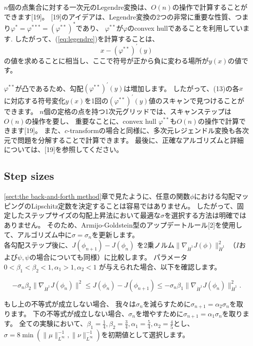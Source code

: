 \documentclass{jsarticle}
\theoremstyle{definition}
\begin{document}
$n$個の点集合に対する一次元のLegendre変換は、$O(n)$の操作で計算することができます[19]。
[19]のアイデアは、Legendre変換の2つの非常に重要な性質、つまり$\varphi^* = \varphi^{***} = (\varphi^{**})^*$であり、
$\varphi^{**}$が$\varphi$のconvex hullであることを利用しています.
したがって、(\ref{eq:legendre})を計算することは、
\begin{equation}
  x - (\varphi^{**})^\prime(y)
\end{equation}
の値を求めることに相当し、ここで符号が正から負に変わる場所が$y(x)$の値です。

$\varphi^{**}$が凸であるため、勾配$(\varphi^{**})^\prime(y)$は増加します。
したがって、(13)の各$x$に対応する符号変化$y(x)$を1回の$(\varphi^{**})^\prime(y)$値のスキャンで見つけることができます。
$n$個の定格の点を持つ1次元グリッドでは、スキャンステップは$O(n)$の操作を要し、
重要なことに、convex hull $\varphi^{**}$も$O(n)$の操作で計算できます[19]。
また、$c$-transformの場合と同様に、多次元レジェンドル変換も各次元で問題を分解することで計算できます。
最後に、正確なアルゴリズムと詳細については、[19]を参照してください。

\subsection{Step sizes}

\ref{sect:the back-and-forth method}章で見たように、任意の関数$\phi$における勾配マッピングのLipschitz定数を決定することは容易ではありません。
したがって、固定したステップサイズの勾配上昇法において最適な$\sigma$を選択する方法は明確ではありません。
そのため、Armijo-Goldstein型のアップデートルール[2]を使用して、アルゴリズム中に$\sigma = \sigma_n$を更新します。\\

各勾配ステップ後に、$J(\phi_{n+1})-J(\phi_n)$ を2乗ノルム$\| \nabla_{\dot{H}^1} J(\phi) \|_{\dot{H}^1}^2$ （$I$および$\psi, \psi$の場合についても同様）に比較します。
パラメータ$0<\beta_1<\beta_2<1, \alpha_1>1, \alpha_2<1$ が与えられた場合、以下を確認します。

$$
- \sigma_n \beta_2 \|\nabla_{\dot{H}^1} J(\phi_n)\|^2 \leq J(\phi_n)-J(\phi_{n+1}) \leq - \sigma_n \beta_1 \|\nabla_{\dot{H}^1} J(\phi_n)\|_{\dot{H}^1}^2.
$$

もし上の不等式が成立しない場合、
我々は$\sigma_n$を減らすために$\sigma_{n+1}=\alpha_2\sigma_n$を取ります。
下の不等式が成立しない場合、$\sigma_n$を増やすために$\sigma_{n+1}=\alpha_1\sigma_n$を取ります。
全ての実験において、$\beta_1 = \frac{1}{4},\beta_2 = \frac{3}{4}, \alpha_1 = \frac{5}{4}, \alpha_2 = \frac{4}{5}$とし、$\sigma = 8 \min(\|\mu\|_{L^\infty}^{-1}, \|\nu\|_{L^\infty}^{-1})$を初期値として選択します。\\
\end{document}
